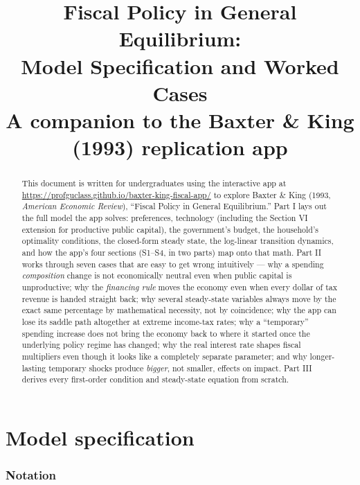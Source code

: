 \documentclass[11pt]{article}
\title{Fiscal Policy in General Equilibrium:\\
Model Specification and Worked Cases\\
\large A companion to the Baxter \& King (1993) replication app}
\author{}
\date{}
\begin{document}
\maketitle

\begin{abstract}
\noindent This document is written for undergraduates using the interactive
app at \url{https://profguclass.github.io/baxter-king-fiscal-app/} to explore Baxter \& King
(1993, \textit{American Economic Review}), ``Fiscal Policy in General
Equilibrium.'' Part I lays out the full model the app solves: preferences,
technology (including the Section VI extension for productive public
capital), the government's budget, the household's optimality conditions,
the closed-form steady state, the log-linear transition dynamics, and how
the app's four sections (S1--S4, in two parts) map onto that math. Part II works
through seven cases that are easy to get wrong intuitively --- why a
spending \emph{composition} change is not economically neutral even when
public capital is unproductive; why the \emph{financing rule} moves the
economy even when every dollar of tax revenue is handed straight back; why
several steady-state variables always move by the exact same percentage by
mathematical necessity, not by coincidence; why the app can lose its
saddle path altogether at extreme income-tax rates; why a ``temporary''
spending increase does not bring the economy back to where it started
once the underlying policy regime has changed; why the real interest
rate shapes fiscal multipliers even though it looks like a completely
separate parameter; and why longer-lasting temporary shocks produce
\emph{bigger}, not smaller, effects on impact. Part III derives
every first-order condition and steady-state equation from scratch.
\end{abstract}

\tableofcontents

\part{Model specification}

\section{Notation}
\end{document}
